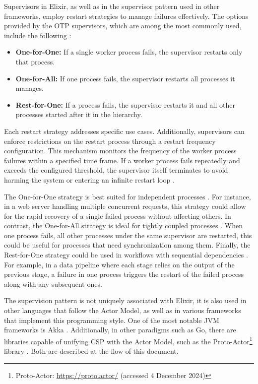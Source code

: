 Supervisors in Elixir, as well as in the supervisor pattern used in other frameworks, employ restart strategies to manage failures effectively. The options provided by the \gls{OTP} supervisors, which are among the most commonly used, include the following \cite{elixir-docs-hexdocs,Juric2024,Armstrong2013}:

\begin{itemize}
    \item \textbf{One-for-One:} If a single worker process fails, the supervisor restarts only that process.
    \item \textbf{One-for-All:} If one process fails, the supervisor restarts all processes it manages.
    \item \textbf{Rest-for-One:} If a process fails, the supervisor restarts it and all other processes started after it in the hierarchy.
\end{itemize}

Each restart strategy addresses specific use cases. Additionally, supervisors can enforce restrictions on the restart process through a restart frequency configuration. This mechanism monitors the frequency of the worker process failures within a specified time frame. If a worker process fails repeatedly and exceeds the configured threshold, the supervisor itself terminates to avoid harming the system or entering an infinite restart loop \cite{Armstrong2013}.

The One-for-One strategy is best suited for independent processes \cite{Armstrong2013}. For instance, in a web server handling multiple concurrent requests, this strategy could allow for the rapid recovery of a single failed process without affecting others. In contrast, the One-for-All strategy is ideal for tightly coupled processes \cite{Armstrong2013}. When one process fails, all other processes under the same supervisor are restarted, this could be useful for processes that need synchronization among them. Finally, the Rest-for-One strategy could be used in workflows with sequential dependencies \cite{elixir-docs-hexdocs}. For example, in a data pipeline where each stage relies on the output of the previous stage, a failure in one process triggers the restart of the failed process along with any subsequent ones.

The supervision pattern is not uniquely associated with Elixir, it is also used in other languages that follow the Actor Model, as well as in various frameworks that implement this programming style. One of the most notable \gls{JVM} frameworks is Akka \cite{akka-docs}. Additionally, in other paradigms such as Go, there are libraries capable of unifying \gls{CSP} with the Actor Model, such as the Proto-Actor\footnote{Proto-Actor: \url{https://proto.actor/} (accessed 4 December 2024)} library \cite{proto-actor-docs}. Both are described at the flow of this document.

